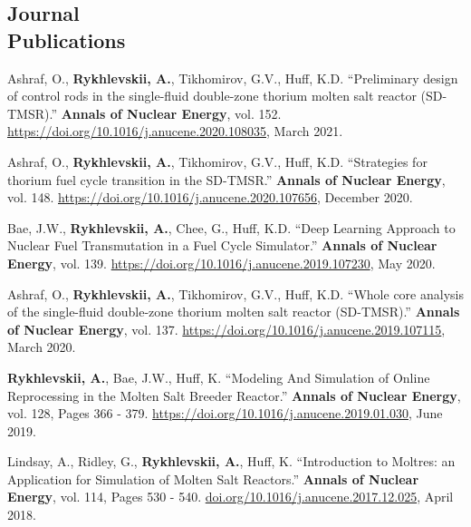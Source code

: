 \documentclass[margin,line]{resume}
\begin{document}
\begin{resume}
    \section{\mysidestyle Journal\\Publications}
      \begin{bibenum}
        \item Ashraf, O., \textbf{Rykhlevskii, A.}, Tikhomirov, G.V., Huff, 
      	K.D. ``Preliminary design of control rods in the single-fluid 
      	double-zone thorium molten salt reactor (SD-TMSR).''
      	\textbf{Annals of Nuclear Energy}, vol. 152. 
      	\url{https://doi.org/10.1016/j.anucene.2020.108035}, March 
      	2021.  	
	    \item Ashraf, O., \textbf{Rykhlevskii, A.}, Tikhomirov, G.V., Huff, 
		K.D. ``Strategies for thorium fuel cycle transition in the SD-TMSR.''
		\textbf{Annals of Nuclear Energy}, vol. 148. 
		\url{https://doi.org/10.1016/j.anucene.2020.107656}, December 
		2020.   	
 		\item Bae, J.W., \textbf{Rykhlevskii, A.}, Chee, G., Huff, K.D. ``Deep 
		 Learning Approach to Nuclear Fuel Transmutation in a Fuel Cycle 
		 Simulator.'' \textbf{Annals of Nuclear Energy}, vol. 139. 
		 \url{https://doi.org/10.1016/j.anucene.2019.107230}, May 2020.
	    \item Ashraf, O., \textbf{Rykhlevskii, A.}, Tikhomirov, G.V., Huff, 
		K.D. ``Whole core analysis of the single-fluid double-zone thorium 
		molten salt reactor (SD-TMSR).'' \textbf{Annals of Nuclear Energy}, 
		vol. 137. \url{https://doi.org/10.1016/j.anucene.2019.107115}, March 
		2020.
	    \item \textbf{Rykhlevskii, A.}, Bae, J.W., Huff, K. ``Modeling And 
	    Simulation of Online Reprocessing in the Molten Salt Breeder 
	    Reactor.'' \textbf{Annals of Nuclear Energy}, vol. 128, Pages 366 - 
	    379. \url{https://doi.org/10.1016/j.anucene.2019.01.030}, June 2019.
       \item Lindsay, A., Ridley, G., \textbf{Rykhlevskii, A.}, Huff, K. ``Introduction to 
               Moltres: an Application for Simulation of Molten Salt 
               Reactors.''  \textbf{Annals of Nuclear Energy}, vol. 114, Pages 
               530 - 540. \url{doi.org/10.1016/j.anucene.2017.12.025}, April 
               2018.
      \end{bibenum}
\vspace{2mm} %

\end{resume}
\end{document}
